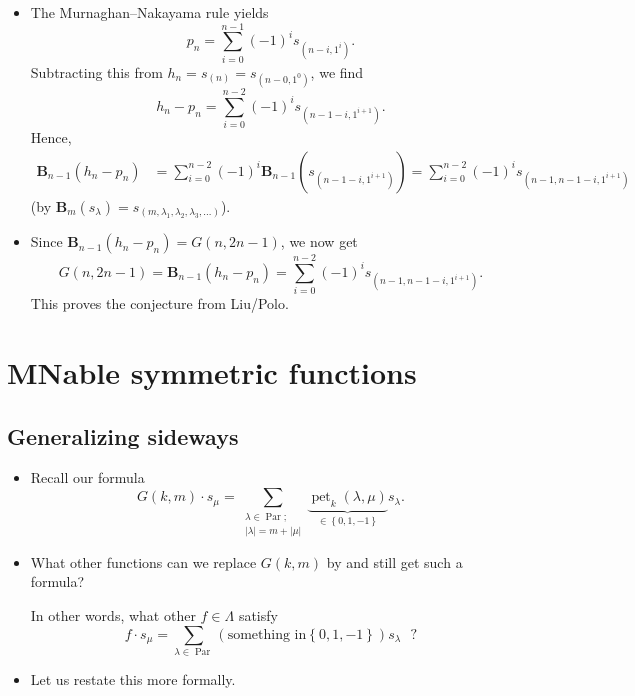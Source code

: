 \documentclass[numbers=enddot,12pt,final,onecolumn,notitlepage]{scrartcl}%
\newcommand{\Par}{\operatorname{Par}}
\newcommand{\0}{\phantom{c}}
\let\sumnonlimits\sum
\renewcommand{\sum}{\sumnonlimits\limits}
\newcommand{\nowbox}{\hphantom{x} \vspace{-1.5pc}}
\begin{document}
\begin{itemize}
\item The Murnaghan--Nakayama rule yields%
\[
p_{n}=\sum_{i=0}^{n-1}\left(  -1\right)  ^{i}s_{\left(  n-i,1^{i}\right)  }.
\]
Subtracting this from $h_{n}=s_{\left(  n\right)  }=s_{\left(  n-0,1^{0}%
\right)  }$, we find
\[
h_{n}-p_{n}=\sum_{i=0}^{n-2}\left(  -1\right)  ^{i}s_{\left(  n-1-i,1^{i+1}%
\right)  }.
\]
Hence,%
\begin{align*}
\mathbf{B}_{n-1}\left(  h_{n}-p_{n}\right)   &  =\sum_{i=0}^{n-2}\left(
-1\right)  ^{i}\mathbf{B}_{n-1}\left(  s_{\left(  n-1-i,1^{i+1}\right)
}\right)
  =\sum_{i=0}^{n-2}\left(  -1\right)  ^{i}s_{\left(  n-1,n-1-i,1^{i+1}%
\right)  }%
\end{align*}
(by $\mathbf{B}_{m}\left(  s_{\lambda}\right)  =s_{\left(  m,\lambda
_{1},\lambda_{2},\lambda_{3},\ldots\right)  }$).

\item Since $\mathbf{B}_{n-1}\left(  h_{n}-p_{n}\right)  =G\left(
n,2n-1\right)  $, we now get%
\[
G\left(  n,2n-1\right)  =\mathbf{B}_{n-1}\left(  h_{n}-p_{n}\right)
=\sum_{i=0}^{n-2}\left(  -1\right)  ^{i}s_{\left(  n-1,n-1-i,1^{i+1}\right)
}.
\]
This proves the conjecture from Liu/Polo.
\end{itemize}

\section{MNable symmetric functions}

\subsection{Generalizing sideways}

\begin{itemize}
\item Recall our formula%
\[
G\left(  k,m\right)  \cdot s_{\mu}
=
\sum_{\substack{\lambda \in \Par; \\ \left|\lambda\right| = m+\left\vert \mu\right\vert}}
\underbrace{\operatorname*{pet}%
\nolimits_{k}\left(  \lambda,\mu\right)  }_{\in\left\{  0,1,-1\right\}
}s_{\lambda}.
\]


\item \nowbox
\begin{problem}{}{}
What other functions can we replace $G\left(
k,m\right)  $ by and still get such a formula?

In other words, what other $f\in\Lambda$ satisfy%
\[
f\cdot s_{\mu}=\sum_{\lambda\in\operatorname*{Par}}\left(  \text{something in
}\left\{  0,1,-1\right\}  \right)  s_{\lambda}\ \ \ ?
\]
\end{problem}

\item Let us restate this more formally.
\end{itemize}
\end{document}
